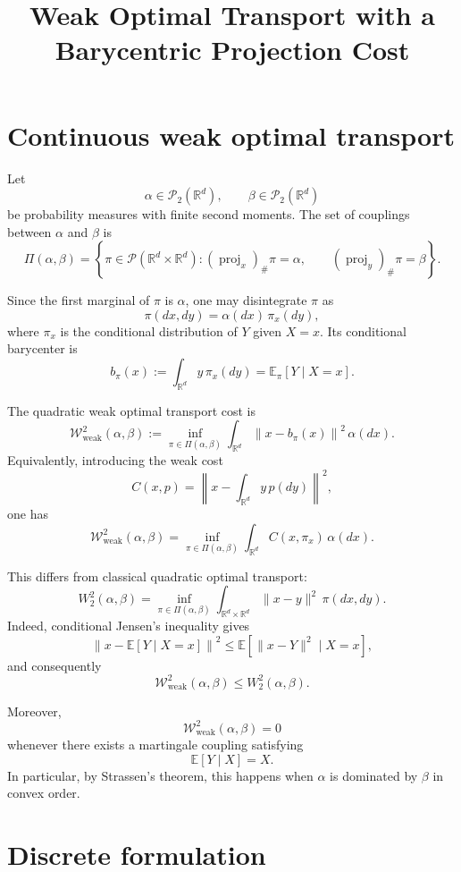 \documentclass[11pt]{article}
\title{Weak Optimal Transport with a Barycentric Projection Cost}
\author{}
\date{}
\newcommand{\R}{\mathbb{R}}
\newcommand{\PiSet}{\Pi}
\begin{document}
\maketitle

\section{Continuous weak optimal transport}

Let
\[
    \alpha\in\mathcal{P}_2(\R^d),
    \qquad
    \beta\in\mathcal{P}_2(\R^d)
\]
be probability measures with finite second moments. The set of couplings between
$\alpha$ and $\beta$ is
\[
    \PiSet(\alpha,\beta)
    =
    \left\{
        \pi\in\mathcal{P}(\R^d\times\R^d):
        (\operatorname{proj}_x)_\#\pi=\alpha,
        \qquad (\operatorname{proj}_y)_\#\pi=\beta
    \right\}.
\]

Since the first marginal of $\pi$ is $\alpha$, one may disintegrate $\pi$ as
\[
    \pi(dx,dy)=\alpha(dx)\,\pi_x(dy),
\]
where $\pi_x$ is the conditional distribution of $Y$ given $X=x$. Its
conditional barycenter is
\[
    b_\pi(x)
    :=
    \int_{\R^d} y\,\pi_x(dy)
    =
    \mathbb{E}_{\pi}[Y\mid X=x].
\]

The quadratic weak optimal transport cost is
\[
    \boxed{
    \mathcal{W}_{\mathrm{weak}}^2(\alpha,\beta)
    :=
    \inf_{\pi\in\PiSet(\alpha,\beta)}
    \int_{\R^d}
    \left\|x-b_\pi(x)\right\|^2
    \,\alpha(dx).
    }
\]
Equivalently, introducing the weak cost
\[
    C(x,p)
    =
    \left\|
        x-\int_{\R^d}y\,p(dy)
    \right\|^2,
\]
one has
\[
    \mathcal{W}_{\mathrm{weak}}^2(\alpha,\beta)
    =
    \inf_{\pi\in\PiSet(\alpha,\beta)}
    \int_{\R^d} C(x,\pi_x)\,\alpha(dx).
\]

This differs from classical quadratic optimal transport:
\[
    W_2^2(\alpha,\beta)
    =
    \inf_{\pi\in\PiSet(\alpha,\beta)}
    \int_{\R^d\times\R^d}
    \|x-y\|^2\,\pi(dx,dy).
\]
Indeed, conditional Jensen's inequality gives
\[
    \left\|x-\mathbb{E}[Y\mid X=x]\right\|^2
    \leq
    \mathbb{E}\left[\|x-Y\|^2\mid X=x\right],
\]
and consequently
\[
    \mathcal{W}_{\mathrm{weak}}^2(\alpha,\beta)
    \leq W_2^2(\alpha,\beta).
\]

Moreover,
\[
    \mathcal{W}_{\mathrm{weak}}^2(\alpha,\beta)=0
\]
whenever there exists a martingale coupling satisfying
\[
    \mathbb{E}[Y\mid X]=X.
\]
In particular, by Strassen's theorem, this happens when $\alpha$ is dominated
by $\beta$ in convex order.

\section{Discrete formulation}
\end{document}
